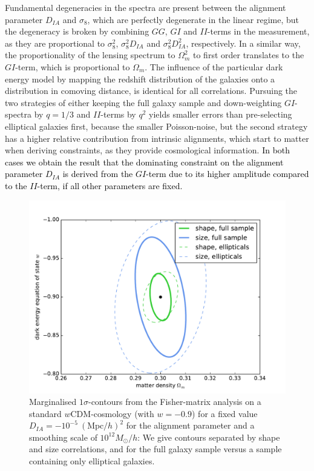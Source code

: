 \documentclass[a4paper,fleqn,usenatbib]{mnras}
\newcommand\BG[1]{\textcolor{black}{#1}}
\begin{document}
Fundamental degeneracies in the spectra are present between the alignment parameter $D_{IA}$ and $\sigma_8$, which are perfectly degenerate in the linear regime, but the degeneracy is broken by combining $GG$, $GI$ and $II$-terms in the measurement, as they are proportional to $\sigma_8^2$, $\sigma_8^2D_{IA}$ and $\sigma_8^2D_{IA}^2$, respectively. In a  similar way, the proportionality of the lensing spectrum to $\Omega_m^2$ to first order translates to the $GI$-term, which is proportional to $\Omega_m$. The influence of the particular dark energy model by mapping the redshift distribution of the galaxies onto a distribution in comoving distance, is identical for all correlations. Pursuing the two strategies of either keeping the full galaxy sample and down-weighting $GI$-spectra by $q=1/3$ and $II$-terms by $q^2$ yields smaller errors than pre-selecting elliptical galaxies first, because the smaller Poisson-noise, but the second strategy has a higher relative contribution from intrinsic alignments, which start to matter when deriving constraints, as they provide cosmological information. \BG{In both cases we obtain the result that the dominating constraint on the alignment parameter $D_{IA}$ is derived from the $GI$-term due to its higher amplitude compared to the $II$-term, if all other parameters are fixed.} 

\begin{figure}
\centering
\includegraphics[scale=0.45]{./figures/fisher.pdf}
\caption{Marginalised $1\sigma$-contours from the Fisher-matrix analysis on a standard $w$CDM-cosmology (with $w=-0.9$) for a fixed value $D_{IA}=-10^{-5}~(\mathrm{Mpc}/h)^2$ for the alignment parameter and a smoothing scale of $10^{12}M_\odot/h$: We give contours separated by shape and size correlations, and for the full galaxy sample versus a sample containing only elliptical galaxies.}
\label{fig:fisher}
\end{figure}
\end{document}
